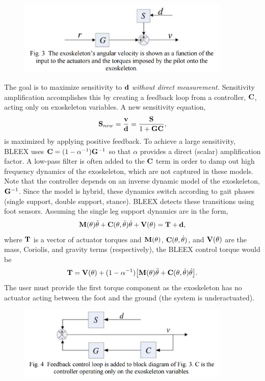 \begin{refsection}
\begin{figure}[ht]
  \centering
  \includegraphics[width=4.0in]{exos/figs/bleex_control_diag_1.png}
\end{figure}

The goal is to maximize sensitivity to ${\bf d}$ \emph{without direct measurement.}  Sensitivity amplification accomplishes this by creating a feedback loop from a controller, ${\bf C}$, acting only on exoskeleton variables.  A new sensitivity equation,
\[{\bf S}_{new} = \frac{{\bf v}}{{\bf d}} = \frac{{\bf S}}{1 + {\bf G} {\bf C}} ,\]
is maximized by applying positive feedback.  To achieve a large sensitivity, BLEEX uses ${\bf C} = (1-\alpha^{-1}){\bf G}^{-1}$ so that $\alpha$ provides a direct (scalar) amplification factor. A low-pass filter is often added to the ${\bf C}$ term in order to damp out high frequency dynamics of the exoskeleton, which are not captured in these models.  Note that the controller depends on an inverse dynamic model of the exoskeleton, ${\bf G}^{-1}$.  Since the model is hybrid, these dynamics switch according to gait phases (single support, double support, stance).  BLEEX detects these transitions using foot sensors.  Assuming the single leg support dynamics are in the form,
\begin{equation}
{\bf M}({\bf\theta})\ddot{{\bf \theta}} + {\bf C}({\bf\theta},\dot{{\bf\theta}}) \dot{{\bf \theta}} + {\bf V}({\bf\theta}) = {\bf T} + {\bf d} ,
\end{equation}
where ${\bf T}$ is a vector of actuator torques and ${\bf M}({\bf\theta})$, ${\bf C}({\bf\theta},\dot{{\bf\theta}})$, and ${\bf V}({\bf\theta})$ are the mass, Coriolis, and gravity terms (respectively), the BLEEX control torque would be
\begin{equation}
{\bf T} = {\bf V}({\bf\theta}) + (1 - \alpha^{-1}) \big [ {\bf M}({\bf\theta})\ddot{{\bf \theta}} + {\bf C}({\bf\theta},\dot{{\bf\theta}}) \dot{{\bf \theta}} \big ] .
\end{equation}
The user must provide the first torque component as the exoskeleton has no actuator acting between the foot and the ground (the system is underactuated).

\begin{figure}[ht]
  \centering
  \includegraphics[width=4.0in]{exos/figs/bleex_control_diag_2.png}
\end{figure}


\end{refsection}

